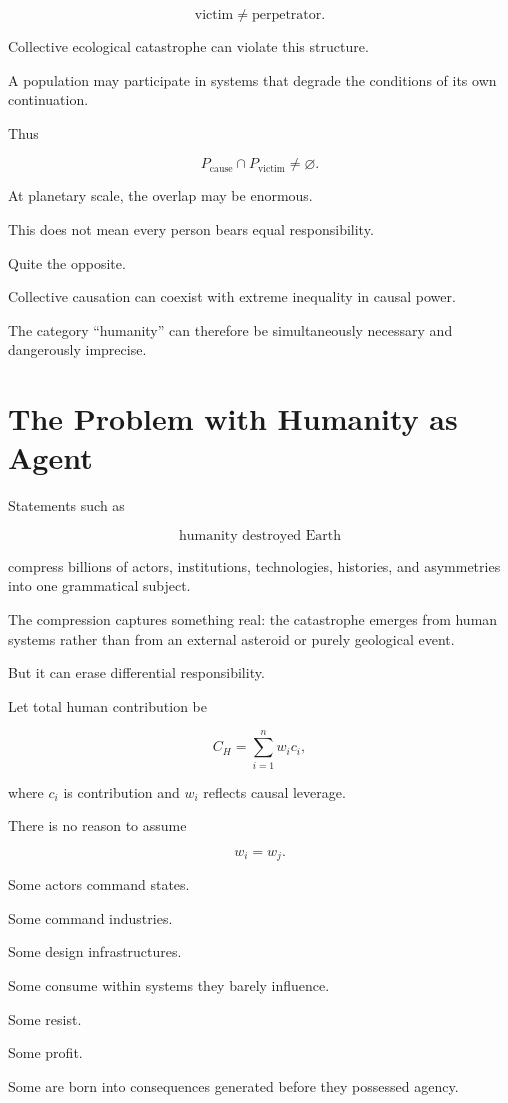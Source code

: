\documentclass[11pt,oneside]{book}
\theoremstyle{definition}
\theoremstyle{remark}
\begin{document}
\[
\text{victim}\neq\text{perpetrator}.
\]

Collective ecological catastrophe can violate this structure.

A population may participate in systems that degrade the conditions of its own continuation.

Thus

\[
P_{\mathrm{cause}}
\cap
P_{\mathrm{victim}}
\neq
\varnothing.
\]

At planetary scale, the overlap may be enormous.

This does not mean every person bears equal responsibility.

Quite the opposite.

Collective causation can coexist with extreme inequality in causal power.

The category ``humanity'' can therefore be simultaneously necessary and dangerously imprecise.

\section{The Problem with Humanity as Agent}

Statements such as

\[
\text{humanity destroyed Earth}
\]

compress billions of actors, institutions, technologies, histories, and asymmetries into one grammatical subject.

The compression captures something real: the catastrophe emerges from human systems rather than from an external asteroid or purely geological event.

But it can erase differential responsibility.

Let total human contribution be

\[
C_H
=
\sum_{i=1}^{n}w_i c_i,
\]

where \(c_i\) is contribution and \(w_i\) reflects causal leverage.

There is no reason to assume

\[
w_i=w_j.
\]

Some actors command states.

Some command industries.

Some design infrastructures.

Some consume within systems they barely influence.

Some resist.

Some profit.

Some are born into consequences generated before they possessed agency.
\end{document}
